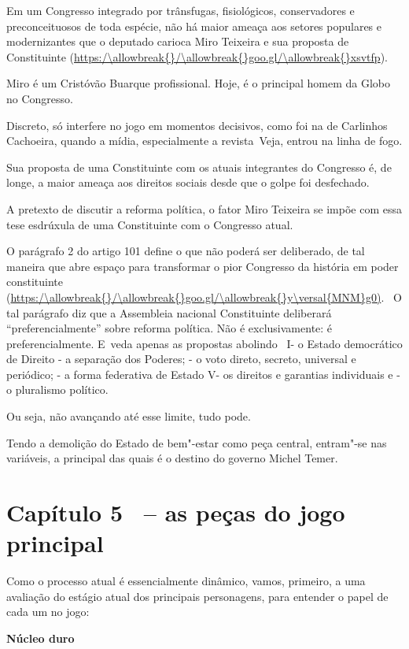 Em um Congresso integrado por trânsfugas, fisiológicos, conservadores e
preconceituosos de toda espécie, não há maior ameaça aos setores
populares e modernizantes que o deputado carioca Miro Teixeira e sua
proposta de Constituinte (\url{https:/\allowbreak{}/\allowbreak{}goo.gl/\allowbreak{}xsvtfp}).

Miro é um Cristóvão Buarque profissional. Hoje, é o principal homem da
Globo no Congresso.

Discreto, só interfere no jogo em momentos decisivos, como foi na 
de Carlinhos Cachoeira, quando a mídia, especialmente a revista~Veja,
entrou na linha de fogo.

Sua proposta de uma Constituinte com os atuais integrantes do Congresso
é, de longe, a maior ameaça aos direitos sociais desde que o golpe foi
desfechado.

A pretexto de discutir a reforma política, o fator Miro Teixeira se
impõe com essa tese esdrúxula de uma Constituinte com o Congresso atual.

O parágrafo 2 do artigo 101 define o que não poderá ser deliberado, de
tal maneira que abre espaço para transformar o pior Congresso da
história em poder constituinte (\url{https:/\allowbreak{}/\allowbreak{}goo.gl/\allowbreak{}y\versal{MNM}g0)}. ~O tal
parágrafo diz que a Assembleia nacional Constituinte deliberará
``preferencialmente'' sobre reforma política. Não é exclusivamente: é
preferencialmente. E~veda apenas as propostas abolindo ~I- o Estado
democrático de Direito - a separação dos Poderes; - o voto direto,
secreto, universal e periódico; - a forma federativa de Estado V- os
direitos e garantias individuais e - o pluralismo político.

Ou seja, não avançando até esse limite, tudo pode.

Tendo a demolição do Estado de bem"-estar como peça central, entram"-se
nas variáveis, a principal das quais é o destino do governo Michel
Temer.

\section{Capítulo 5 ~-- as peças do jogo principal}

Como o processo atual é essencialmente dinâmico, vamos, primeiro, a uma
avaliação do estágio atual dos principais personagens, para entender o
papel de cada um no jogo:

\textbf{Núcleo duro}


